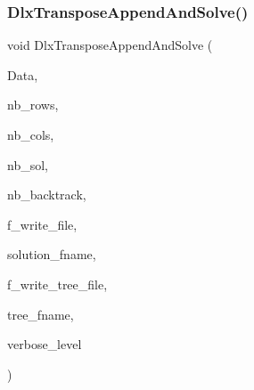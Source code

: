 \mbox{\label{_l_i_b_2_g_a_l_o_i_s_2dlx_8_c_ab1bd224eee5c0b12ff44a71f7f536dd2}} 
\subsubsection{\texorpdfstring{Dlx\+Transpose\+Append\+And\+Solve()}{DlxTransposeAppendAndSolve()}}
{\footnotesize\ttfamily void Dlx\+Transpose\+Append\+And\+Solve (\begin{DoxyParamCaption}\item[{\mbox{\hyperlink{galois_8h_a09fddde158a3a20bd2dcadb609de11dc}{I\+NT}} $\ast$}]{Data,  }\item[{\mbox{\hyperlink{galois_8h_a09fddde158a3a20bd2dcadb609de11dc}{I\+NT}}}]{nb\+\_\+rows,  }\item[{\mbox{\hyperlink{galois_8h_a09fddde158a3a20bd2dcadb609de11dc}{I\+NT}}}]{nb\+\_\+cols,  }\item[{\mbox{\hyperlink{galois_8h_a09fddde158a3a20bd2dcadb609de11dc}{I\+NT}} \&}]{nb\+\_\+sol,  }\item[{\mbox{\hyperlink{galois_8h_a09fddde158a3a20bd2dcadb609de11dc}{I\+NT}} \&}]{nb\+\_\+backtrack,  }\item[{\mbox{\hyperlink{galois_8h_a09fddde158a3a20bd2dcadb609de11dc}{I\+NT}}}]{f\+\_\+write\+\_\+file,  }\item[{const \mbox{\hyperlink{galois_8h_ab6cc7b4aeb6ea31aba2b3fbfc83ff5e6}{B\+Y\+TE}} $\ast$}]{solution\+\_\+fname,  }\item[{\mbox{\hyperlink{galois_8h_a09fddde158a3a20bd2dcadb609de11dc}{I\+NT}}}]{f\+\_\+write\+\_\+tree\+\_\+file,  }\item[{const \mbox{\hyperlink{galois_8h_ab6cc7b4aeb6ea31aba2b3fbfc83ff5e6}{B\+Y\+TE}} $\ast$}]{tree\+\_\+fname,  }\item[{\mbox{\hyperlink{galois_8h_a09fddde158a3a20bd2dcadb609de11dc}{I\+NT}}}]{verbose\+\_\+level }\end{DoxyParamCaption})}

\mbox{\label{_l_i_b_2_g_a_l_o_i_s_2dlx_8_c_afb1d61622a44d0089bc62efbb3ad9bd9}} 
